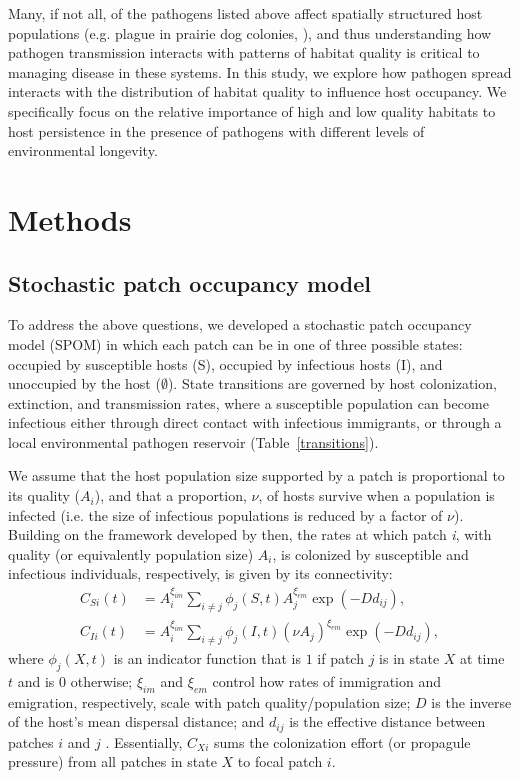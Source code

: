 \documentclass{article}
\begin{document}
Many, if not all, of the pathogens listed above affect spatially structured host populations (e.g. plague in prairie dog colonies, \cite{George2013}), and thus understanding how pathogen transmission interacts with patterns of habitat quality is critical to managing disease in these systems.  In this study, we explore how pathogen spread interacts with the distribution of habitat quality to influence host occupancy.  We specifically focus on the relative importance of high and low quality habitats to host persistence in the presence of pathogens with different levels of environmental longevity. 

\section{Methods}
\label{methods}

\subsection{Stochastic patch occupancy model}

To address the above questions, we developed a stochastic patch occupancy model (SPOM) in which each patch can be in one of three possible states: occupied by susceptible hosts (S), occupied by infectious hosts (I), and unoccupied by the host ($\emptyset$).  State transitions are governed by host colonization, extinction, and transmission rates, where a susceptible population can become infectious either through direct contact with infectious immigrants, or through a local environmental pathogen reservoir (Table~\ref{transitions}).

We assume that the host population size supported by a patch is proportional to its quality ($A_i$), and that a proportion, $\nu$, of hosts survive when a population is infected (i.e. the size of infectious populations is reduced by a factor of $\nu$).  Building on the framework developed by \cite{Hanski2003} then, the rates at which patch \emph{i}, with quality (or equivalently population size) $A_i$, is colonized by susceptible and infectious individuals, respectively, is given by its connectivity:
\begin{align}
C_{Si}(t) &= A_i^{\xi_{im}} \sum_{i\neq j }\phi_j(S, t)A_j^{\xi_{em}}\exp(-D d_{ij}),\\
C_{Ii}(t) &= A_i^{\xi_{im}} \sum_{i\neq j }\phi_j(I, t)(\nu A_j) ^{\xi_{em}}\exp(-D d_{ij}),
\label{connectivity}
\end{align}
where $\phi_j(X, t)$ is an indicator function that is $1$ if patch $j$ is in state $X$ at time $t$ and is $0$ otherwise; $\xi_{im}$ and $\xi_{em}$ control how rates of immigration and emigration, respectively, scale with patch quality/population size; $D$ is the inverse of the host's mean dispersal distance; and $d_{ij}$ is the effective distance between patches $i$ and $j$ .  Essentially, $C_{Xi}$ sums the colonization effort (or propagule pressure) from all patches in state $X$ to focal patch $i$.  
\end{document}
